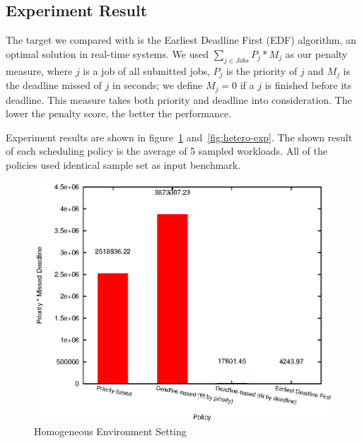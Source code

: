 \subsection{Experiment Result}

The target we compared with is the Earliest Deadline First (EDF)
algorithm, an optimal solution in real-time systems.
We used $\sum_{j \in Jobs} P_j * M_j$ as our penalty measure, where $j$
is a job of all submitted jobs, $P_j$ is the priority of $j$ and $M_j$
is the deadline missed of $j$ in seconds; we define $M_j = 0$ if a $j$
is finished before its deadline.
This measure takes both priority and deadline into consideration.
The lower the penalty score, the better the performance.

Experiment results are shown in figure~\ref{fig:homo-exp}
and~\ref{fig:hetero-exp}.
The shown result of each scheduling policy is the average of 5 sampled
workloads.
All of the policies used identical sample set as input benchmark.

\begin{figure}[htbp]
  \centering
  \includegraphics[width=\textwidth,height=0.7\textheight,keepaspectratio]{figures/homo.eps}
  \caption{Homogeneous Environment Setting}
  \label{fig:homo-exp}
\end{figure}

